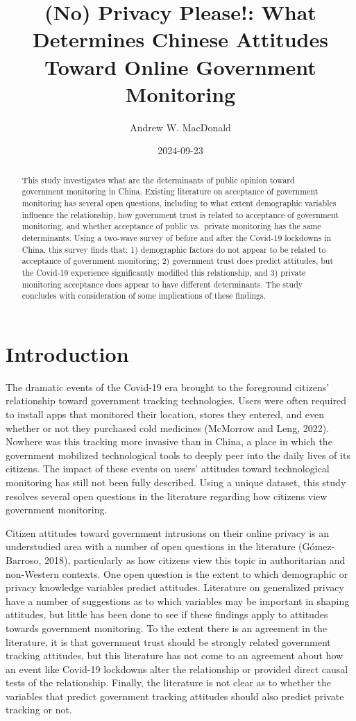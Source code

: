 \documentclass[
  letterpaper,
  DIV=11,
  numbers=noendperiod]{scrartcl}
\title{(No) Privacy Please!: What Determines Chinese Attitudes Toward
Online Government Monitoring}
\author{Andrew W. MacDonald}
\date{2024-09-23}
\begin{document}
\maketitle
\begin{abstract}
This study investigates what are the determinants of public opinion
toward government monitoring in China. Existing literature on acceptance
of government monitoring has several open questions, including to what
extent demographic variables influence the relationship, how government
trust is related to acceptance of government monitoring, and whether
acceptance of public vs.~private monitoring has the same determinants.
Using a two-wave survey of before and after the Covid-19 lockdowns in
China, this survey finds that: 1) demographic factors do not appear to
be related to acceptance of government monitoring; 2) government trust
does predict attitudes, but the Covid-19 experience significantly
modified this relationship, and 3) private monitoring acceptance does
appear to have different determinants. The study concludes with
consideration of some implications of these findings.
\end{abstract}

\section{Introduction}\label{sec-introduction}

The dramatic events of the Covid-19 era brought to the foreground
citizens' relationship toward government tracking technologies. Users
were often required to install apps that monitored their location,
stores they entered, and even whether or not they purchased cold
medicines (McMorrow and Leng, 2022). Nowhere was this tracking more
invasive than in China, a place in which the government mobilized
technological tools to deeply peer into the daily lives of its citizens.
The impact of these events on users' attitudes toward technological
monitoring has still not been fully described. Using a unique dataset,
this study resolves several open questions in the literature regarding
how citizens view government monitoring.

Citizen attitudes toward government intrusions on their online privacy
is an understudied area with a number of open questions in the
literature (Gómez-Barroso, 2018), particularly as how citizens view this
topic in authoritarian and non-Western contexts. One open question is
the extent to which demographic or privacy knowledge variables predict
attitudes. Literature on generalized privacy have a number of
suggestions as to which variables may be important in shaping attitudes,
but little has been done to see if these findings apply to attitudes
towards government monitoring. To the extent there is an agreement in
the literature, it is that government trust should be strongly related
government tracking attitudes, but this literature has not come to an
agreement about how an event like Covid-19 lockdowns alter the
relationship or provided direct causal tests of the relationship.
Finally, the literature is not clear as to whether the variables that
predict government tracking attitudes should also predict private
tracking or not.
\end{document}
